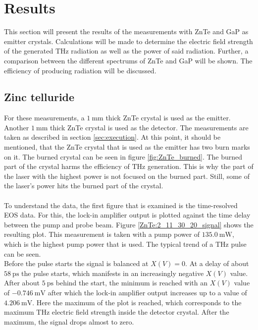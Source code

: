 \chapter{Results}
This section will present the results of the measurements with ZnTe and GaP as emitter crystals.
Calculations will be made to determine the electric field strength of the generated $\si{\tera\hertz}$ radiation as well as the power of said radiation.
Further, a comparison between the different spectrums of ZnTe and GaP will be shown.
The efficiency of producing radiation will be discussed.

\section{Zinc telluride}
For these measurements, a $\SI{1}{\milli\meter}$ thick ZnTe crystal is used as the emitter.
Another $\SI{1}{\milli\meter}$ thick ZnTe crystal is used as the detector.
The measurements are taken as described in section \ref{sec:execution}.
At this point, it should be mentioned, that the ZnTe crystal that is used as the emitter has two burn marks on it.
The burned crystal can be seen in figure \ref{fig:ZnTe_burned}.
The burned part of the crystal harms the efficiency of $\si{\tera\hertz}$ generation.
This is why the part of the laser with the highest power is not focused on the burned part.
Still, some of the laser's power hits the burned part of the crystal.
\\\\
To understand the data, the first figure that is examined is the time-resolved EOS data.
For this, the lock-in amplifier output is plotted against the time delay between the pump and probe beam.
Figure \ref{ZnTe:2_11_30_20_signal} shows the resulting plot.
This measurement is taken with a pump power of $\SI{135.0}{\milli\W}$, which is the highest pump power that is used.
The typical trend of a $\si{\tera\hertz}$ pulse can be seen.
\\
Before the pulse starts the signal is balanced at $X(V)=0$.
At a delay of about $\SI{58}{\pico\second}$ the pulse starts, which manifests in an increasingly negative $X(V)$ value.
After about $\SI{5}{\pico\second}$ behind the start, the minimum is reached with an $X(V)$ value of $\SI{-0.746}{\milli\V}$ after which the lock-in amplifier output increases up to a value of $\SI{4.206}{\milli\V}$.
Here the maximum of the plot is reached, which corresponds to the maximum $\si{\tera\hertz}$ electric field strength inside the detector crystal.
After the maximum, the signal drops almost to zero.
